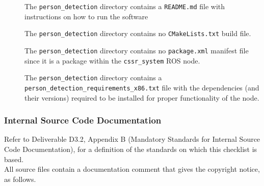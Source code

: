 \documentclass{CSSRforAfrica}
\newcommand{\checkboxChecked}{\fbox{\ding{51}}} %
\begin{document}
\begin{description}
\item[\checkboxChecked] The {\small \verb+person_detection+} directory contains  a {\small \verb+README.md+} file with  instructions on how to run the software 
\item[\checkboxChecked] The {\small \verb+person_detection+} directory contains  no {\small \verb+CMakeLists.txt+} build file.
\item[\checkboxChecked] The {\small \verb+person_detection+} directory contains  no {\small \verb+package.xml+} manifest file since it is a package within the {\small \verb+cssr_system+} ROS node.
\item[\checkboxChecked] The {\small \verb+person_detection+} directory contains  a {\small \verb+person_detection_requirements_x86.txt+} file with the dependencies (and their versions) required to be installed for proper functionality of the node.

\end{description}


 
 \newpage
\subsubsection{Internal Source Code Documentation}
\label{subsubsection:person_detection_documentation_standards}  
 
Refer to Deliverable D3.2, Appendix B (Mandatory Standards for Internal Source Code Documentation), for a definition of the standards on which this checklist is based.\\

\noindent All source files contain a documentation comment that gives the copyright notice, as follows.
 
\end{document}
